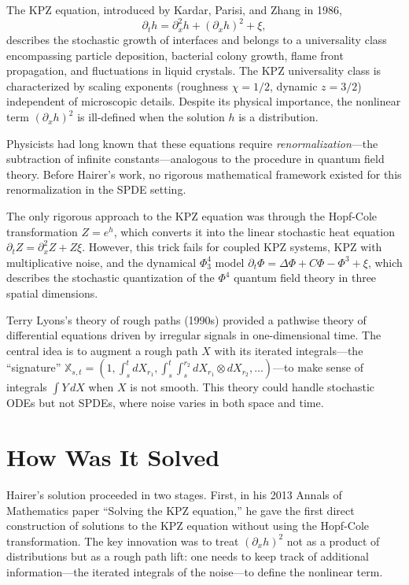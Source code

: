 The KPZ equation, introduced by Kardar, Parisi, and Zhang in 1986,
\[
\partial_t h = \partial_x^2 h + (\partial_x h)^2 + \xi,
\]
describes the stochastic growth of interfaces and belongs to a universality class encompassing particle deposition, bacterial colony growth, flame front propagation, and fluctuations in liquid crystals. The KPZ universality class is characterized by scaling exponents (roughness $\chi = 1/2$, dynamic $z = 3/2$) independent of microscopic details. Despite its physical importance, the nonlinear term $(\partial_x h)^2$ is ill-defined when the solution $h$ is a distribution.

Physicists had long known that these equations require \emph{renormalization}---the subtraction of infinite constants---analogous to the procedure in quantum field theory. Before Hairer's work, no rigorous mathematical framework existed for this renormalization in the SPDE setting.

The only rigorous approach to the KPZ equation was through the Hopf-Cole transformation $Z = e^h$, which converts it into the linear stochastic heat equation $\partial_t Z = \partial_x^2 Z + Z\xi$. However, this trick fails for coupled KPZ systems, KPZ with multiplicative noise, and the dynamical $\Phi^4_3$ model $\partial_t\Phi = \Delta\Phi + C\Phi - \Phi^3 + \xi$, which describes the stochastic quantization of the $\Phi^4$ quantum field theory in three spatial dimensions.

Terry Lyons's theory of rough paths (1990s) provided a pathwise theory of differential equations driven by irregular signals in one-dimensional time. The central idea is to augment a rough path $X$ with its iterated integrals---the ``signature'' $\mathbb{X}_{s,t} = (1, \int_s^t dX_{r_1}, \int_s^t\int_s^{r_2} dX_{r_1}\otimes dX_{r_2}, \ldots)$---to make sense of integrals $\int Y\,dX$ when $X$ is not smooth. This theory could handle stochastic ODEs but not SPDEs, where noise varies in both space and time.

\section{How Was It Solved}

Hairer's solution \cite{hairer2014} proceeded in two stages. First, in his 2013 Annals of Mathematics paper ``Solving the KPZ equation,'' he gave the first direct construction of solutions to the KPZ equation without using the Hopf-Cole transformation. The key innovation was to treat $(\partial_x h)^2$ not as a product of distributions but as a rough path lift: one needs to keep track of additional information---the iterated integrals of the noise---to define the nonlinear term.

